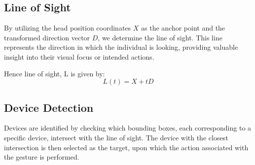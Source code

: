 \subsection{Line of Sight}
By utilizing the head position coordinates $X$ as the anchor point and the transformed direction vector $D$, we determine the line of sight. This line represents the direction in which the individual is looking, providing valuable insight into their visual focus or intended actions.

Hence line of sight, L is given by:
\[
	L(t) = X + tD
\]

\subsection{Device Detection}
Devices are identified by checking which bounding boxes, each corresponding to a specific device, intersect with the line of sight. The device with the closest intersection is then selected as the target, upon which the action associated with the gesture is performed.
